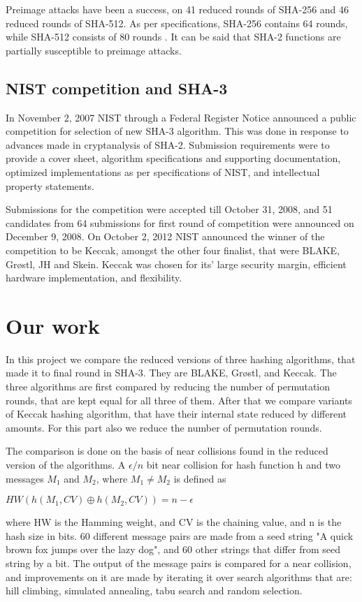   Preimage attacks have been a success, on 41 reduced rounds of SHA-256 and 46 reduced rounds of SHA-512. 
  As per specifications, SHA-256 contains 64 rounds, while SHA-512 consists of 80 rounds \cite{00011}. It can be
  said that SHA-2 functions are partially susceptible to preimage attacks.

  \subsection{NIST competition and SHA-3}

  In November 2, 2007 NIST through a Federal Register Notice announced a public competition for selection of
  new SHA-3 algorithm. This was done in response to advances made in cryptanalysis of SHA-2.
  Submission requirements were to provide a cover sheet, algorithm specifications and supporting
  documentation, optimized implementations as per specifications of NIST, and intellectual property statements.

  Submissions for the competition were accepted till October 31, 2008, and 51 candidates from 64 submissions
  for first round of competition were announced on December 9, 2008. On October 2, 2012 NIST announced the 
  winner of the competition to be Keccak, amongst the other four finalist, that were BLAKE, Gr{\o}stl, JH
  and Skein. Keccak was chosen for its' large security margin, efficient hardware implementation, and 
  flexibility.
  
\section{Our work}

In this project we compare the reduced versions of three hashing algorithms, that made it to final round in SHA-3.
They are BLAKE, Gr{\o}stl, and Keccak. The three algorithms are first compared by reducing the number of
permutation rounds, that are kept equal for all three of them. After that we compare variants of Keccak hashing
algorithm, that have their internal state reduced by different amounts. For this part also we reduce the number
of permutation rounds.

The comparison is done on the basis of near collisions found in the reduced version of the algorithms. A
$\epsilon / n $ bit near collision for hash function h and two messages $M_{1}$ and $M_{2}$, where 
$M_{1} \neq M_{2}$ is defined as
\begin{center}$ HW( h( M_{1}, CV ) \oplus h( M_{2}, CV ) ) = n - \epsilon $\end{center}
where HW is the Hamming weight, and CV is the chaining value, and n is the hash size in bits. 60 different message
pairs are made from a seed string "A quick brown fox jumps over the lazy dog", and 60 other strings that differ
from seed string by a bit. The output of the message pairs is compared for a near collision, and improvements
on it are made by iterating it over search algorithms that are: hill climbing, simulated annealing, tabu search 
and random selection.

